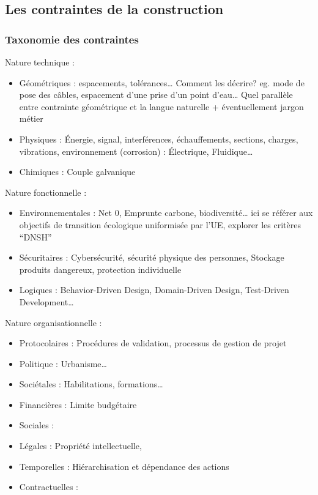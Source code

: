 \documentclass[a4paper,12pt]{article}
\begin{document}
\subsection{Les contraintes de la construction}
\label{sec:org32e5916}
\subsubsection{Taxonomie des contraintes}
\label{sec:org39d5ce2}
Nature technique :
\begin{itemize}
\item Géométriques : espacements, tolérances…
Comment les décrire? eg. mode de pose des câbles, espacement d’une prise d’un point d’eau…
Quel parallèle entre contrainte géométrique et la langue naturelle + éventuellement jargon métier
\item Physiques : Énergie, signal, interférences, échauffements, sections, charges, vibrations, environnement (corrosion) : Électrique, Fluidique…
\item Chimiques : Couple galvanique
\end{itemize}

Nature fonctionnelle :
\begin{itemize}
\item Environnementales : Net 0, Emprunte carbone, biodiversité… ici se référer aux objectifs de transition écologique uniformisée par l’UE, explorer les critères “DNSH”
\item Sécuritaires : Cybersécurité, sécurité physique des personnes, Stockage produits dangereux, protection individuelle
\item Logiques : Behavior-Driven Design, Domain-Driven Design, Test-Driven Development\ldots{}
\end{itemize}

Nature organisationnelle :
\begin{itemize}
\item Protocolaires : Procédures de validation, processus de gestion de projet
\item Politique : Urbanisme\ldots{}
\item Sociétales :  Habilitations, formations\ldots{}
\item Financières : Limite budgétaire
\item Sociales :
\item Légales : Propriété intellectuelle,
\item Temporelles : Hiérarchisation et dépendance des actions
\item Contractuelles :
\end{itemize}
\end{document}
